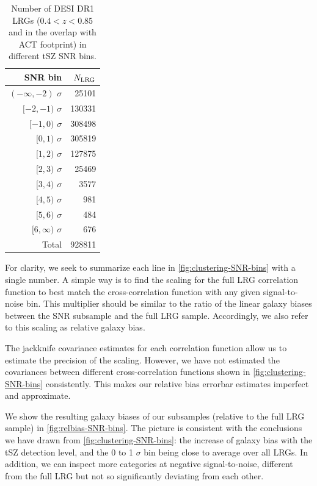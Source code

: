 \begin{table}[htbp]
    \centering
    \begin{tabular}{|r|r|}
        \hline
        SNR bin & $N_{\rm LRG}$ \\
        \hline
        $(-\infty, -2)$ $\sigma$ & 25101 \\
        $[-2, -1)$ $\sigma$ & 130331 \\
        $[-1, 0)$ $\sigma$ & 308498 \\
        $[0, 1)$ $\sigma$ & 305819 \\
        $[1, 2)$ $\sigma$ & 127875 \\
        $[2, 3)$ $\sigma$ & 25469 \\
        $[3, 4)$ $\sigma$ & 3577 \\
        $[4, 5)$ $\sigma$ & 981 \\
        $[5, 6)$ $\sigma$ & 484 \\
        $[6, \infty)$ $\sigma$ & 676 \\
        \hline
        Total & 928811 \\
        \hline
    \end{tabular}
    \caption[Number of galaxies in our tSZ SNR bins]{Number of DESI DR1 LRGs ($0.4<z<0.85$ and in the overlap with ACT footprint) in different tSZ SNR bins.}
    \label{tab:galaxy-numbers-SNR-bins}
\end{table}

For clarity, we seek to summarize each line in \cref{fig:clustering-SNR-bins} with a single number.
A simple way is to find the scaling for the full LRG correlation function to best match the cross-correlation function with any given signal-to-noise bin.
This multiplier should be similar to the ratio of the linear galaxy biases between the SNR subsample and the full LRG sample.
Accordingly, we also refer to this scaling as relative galaxy bias.

The jackknife covariance estimates for each correlation function allow us to estimate the precision of the scaling.
However, we have not estimated the covariances between different cross-correlation functions shown in \cref{fig:clustering-SNR-bins} consistently.
This makes our relative bias errorbar estimates imperfect and approximate.

We show the resulting galaxy biases of our subsamples (relative to the full LRG sample) in \cref{fig:relbias-SNR-bins}.
The picture is consistent with the conclusions we have drawn from \cref{fig:clustering-SNR-bins}: the increase of galaxy bias with the tSZ detection level, and the 0 to 1 $\sigma$ bin being close to average over all LRGs.
In addition, we can inspect more categories at negative signal-to-noise, different from the full LRG but not so significantly deviating from each other.


